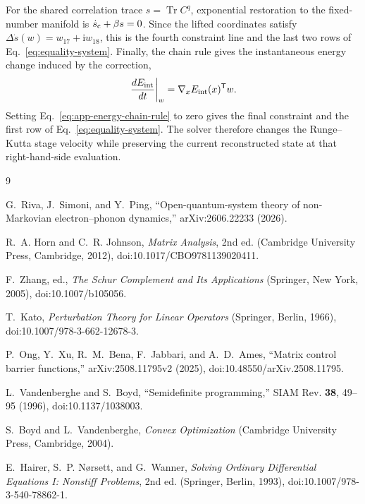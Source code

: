 \documentclass[10pt,twocolumn]{article}
\newcommand{\ii}{\mathrm i}
\newcommand{\Tr}{\operatorname{Tr}}
\begin{document}
For the shared correlation trace $s=\Tr C^q$, exponential restoration to the
fixed-number manifold is $\dot s_{\rm c}+\beta s=0$.  Since the lifted
coordinates satisfy
$\Delta\dot s(w)=w_{17}+\ii w_{18}$, this is the fourth constraint line and
the last two rows of Eq.~\eqref{eq:equality-system}.  Finally, the chain rule
gives the instantaneous energy change induced by the correction,
\begin{equation}
\left.\frac{dE_{\rm int}}{dt}\right|_{w}
=\nabla_xE_{\rm int}(x)^\mathsf Tw.
\label{eq:app-energy-chain-rule}
\end{equation}
Setting Eq.~\eqref{eq:app-energy-chain-rule} to zero gives the final
constraint and the first row of Eq.~\eqref{eq:equality-system}.  The solver
therefore changes the Runge--Kutta stage velocity while preserving the
current reconstructed state at that right-hand-side evaluation.

\begin{thebibliography}{9}
\raggedright

G.~Riva, J.~Simoni, and Y.~Ping,
``Open-quantum-system theory of non-Markovian electron--phonon dynamics,''
arXiv:2606.22233 (2026).

R.~A. Horn and C.~R. Johnson,
\emph{Matrix Analysis}, 2nd ed. (Cambridge University Press, Cambridge,
2012), doi:10.1017/CBO9781139020411.

F.~Zhang, ed., \emph{The Schur Complement and Its Applications}
(Springer, New York, 2005), doi:10.1007/b105056.

T.~Kato, \emph{Perturbation Theory for Linear Operators}
(Springer, Berlin, 1966), doi:10.1007/978-3-662-12678-3.

P.~Ong, Y.~Xu, R.~M.~Bena, F.~Jabbari, and A.~D.~Ames,
``Matrix control barrier functions,'' arXiv:2508.11795v2 (2025),
doi:10.48550/arXiv.2508.11795.

L.~Vandenberghe and S.~Boyd, ``Semidefinite programming,''
SIAM Rev. \textbf{38}, 49--95 (1996), doi:10.1137/1038003.

S.~Boyd and L.~Vandenberghe, \emph{Convex Optimization}
(Cambridge University Press, Cambridge, 2004).

E.~Hairer, S.~P. N\o rsett, and G.~Wanner,
\emph{Solving Ordinary Differential Equations I: Nonstiff Problems},
2nd ed. (Springer, Berlin, 1993), doi:10.1007/978-3-540-78862-1.

\end{thebibliography}
\end{document}
